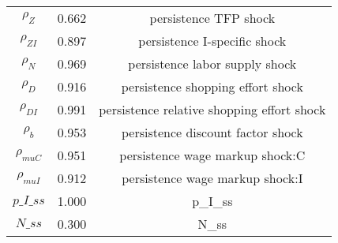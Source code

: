 \begin{center}
\begin{longtable}{ccc}
${\rho_Z}$ 	 & 	 0.662 	 & 	 persistence TFP shock\\
${\rho_{ZI}}$ 	 & 	 0.897 	 & 	 persistence I-specific shock\\
${\rho_N}$ 	 & 	 0.969 	 & 	 persistence labor supply shock\\
${\rho_D}$ 	 & 	 0.916 	 & 	 persistence shopping effort shock\\
${\rho_{DI}}$ 	 & 	 0.991 	 & 	 persistence relative shopping effort shock\\
${\rho_b}$ 	 & 	 0.953 	 & 	 persistence discount factor shock\\
${\rho_{muC}}$ 	 & 	 0.951 	 & 	 persistence wage markup shock:C\\
${\rho_{muI}}$ 	 & 	 0.912 	 & 	 persistence wage markup shock:I\\
$p\_I\_ss$ 	 & 	 1.000 	 & 	 p\_I\_ss\\
$N\_ss$ 	 & 	 0.300 	 & 	 N\_ss\\
\bottomrule%
\end{longtable}
\end{center}
